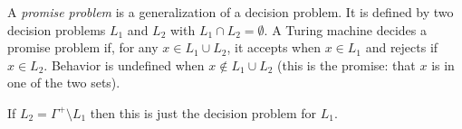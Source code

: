 \documentclass[12pt]{article}
\begin{document}
A \emph{promise problem} is a generalization of a decision problem.  It is defined by two decision problems $L_1$ and $L_2$ with $L_1\cap L_2=\emptyset$.  A Turing machine decides a promise problem if, for any $x\in L_1\cup L_2$, it accepts when $x\in L_1$ and rejects if $x\in L_2$.  Behavior is undefined when $x\notin L_1\cup L_2$ (this is the promise: that $x$ is in one of the two sets).

If $L_2=\Gamma^+\setminus L_1$ then this is just the decision problem for $L_1$.
\end{document}
